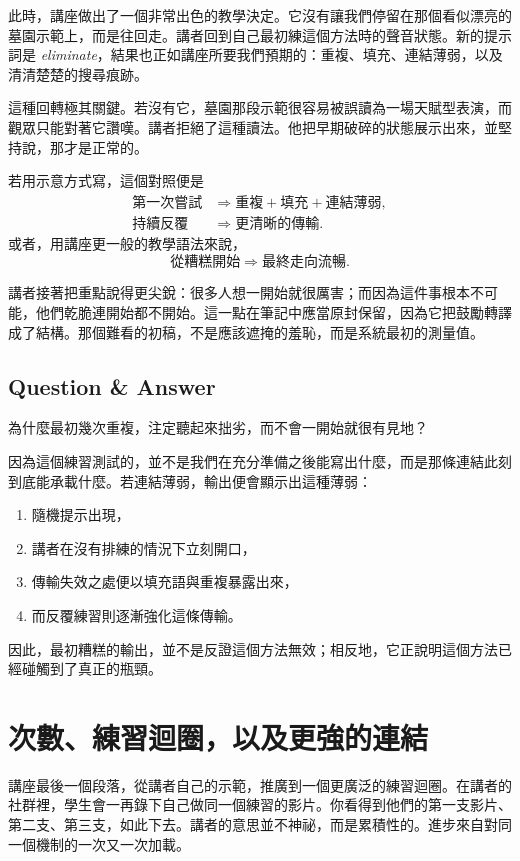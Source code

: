 此時，講座做出了一個非常出色的教學決定。它沒有讓我們停留在那個看似漂亮的墓園示範上，而是往回走。講者回到自己最初練這個方法時的聲音狀態。新的提示詞是 \emph{eliminate}，結果也正如講座所要我們預期的：重複、填充、連結薄弱，以及清清楚楚的搜尋痕跡。

這種回轉極其關鍵。若沒有它，墓園那段示範很容易被誤讀為一場天賦型表演，而觀眾只能對著它讚嘆。講者拒絕了這種讀法。他把早期破碎的狀態展示出來，並堅持說，那才是正常的。

若用示意方式寫，這個對照便是
\begin{align}
\text{第一次嘗試} &\Longrightarrow \text{重複} + \text{填充} + \text{連結薄弱},\\
\text{持續反覆} &\Longrightarrow \text{更清晰的傳輸}.
\end{align}
或者，用講座更一般的教學語法來說，
\begin{equation}
\text{從糟糕開始} \Longrightarrow \text{最終走向流暢}.
\end{equation}

講者接著把重點說得更尖銳：很多人想一開始就很厲害；而因為這件事根本不可能，他們乾脆連開始都不開始。這一點在筆記中應當原封保留，因為它把鼓勵轉譯成了結構。那個難看的初稿，不是應該遮掩的羞恥，而是系統最初的測量值。

\subsection{Question \& Answer}

為什麼最初幾次重複，注定聽起來拙劣，而不會一開始就很有見地？

因為這個練習測試的，並不是我們在充分準備之後能寫出什麼，而是那條連結此刻到底能承載什麼。若連結薄弱，輸出便會顯示出這種薄弱：
\begin{enumerate}
\item 隨機提示出現，
\item 講者在沒有排練的情況下立刻開口，
\item 傳輸失效之處便以填充語與重複暴露出來，
\item 而反覆練習則逐漸強化這條傳輸。
\end{enumerate}
因此，最初糟糕的輸出，並不是反證這個方法無效；相反地，它正說明這個方法已經碰觸到了真正的瓶頸。

\section{次數、練習迴圈，以及更強的連結}

講座最後一個段落，從講者自己的示範，推廣到一個更廣泛的練習迴圈。在講者的社群裡，學生會一再錄下自己做同一個練習的影片。你看得到他們的第一支影片、第二支、第三支，如此下去。講者的意思並不神祕，而是累積性的。進步來自對同一個機制的一次又一次加載。

